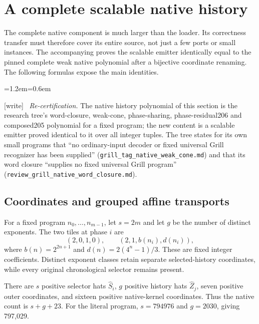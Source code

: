 \documentclass[11pt,letterpaper]{article}
\theoremstyle{definition}\newtheorem{definition}[theorem]{Definition}
\theoremstyle{remark}\newtheorem{remark}[theorem]{Remark}
\newcommand{\fname}[1]{\texttt{\small\detokenize{#1}}}
\newcommand{\wtag}{\textup{[write]}}
\newenvironment{writenote}{\par\smallskip\begin{list}{}{\leftmargin=1.2em\rightmargin=0.6em}\item[]\small\wtag\ }{\end{list}\smallskip}
\newcommand{\rw}[1]{\nolinkurl{#1}}%
\begin{document}
\section{A complete scalable native history}\label{fup:gp:sec:native}
The complete native component is much larger than the loader. Its correctness transfer must therefore cover its entire source, not just a few ports or small instances. The accompanying \fname{native_history_proof.md} proves the scalable emitter identically equal to the pinned complete weak native polynomial after a bijective coordinate renaming. The following formulas expose the main identities.
\begin{writenote}
\emph{Re-certification.} The native history polynomial of this section is the research tree's word-closure, weak-cone, phase-sharing, phase-residual206 and composed205 polynomial for a fixed program; the new content is a scalable emitter proved identical to it over all integer tuples. The tree states for its own small programs that ``no ordinary-input decoder or fixed universal Grill recognizer has been supplied'' (\rw{grill_tag_native_weak_cone.md}) and that its word closure ``supplies no fixed universal Grill program'' (\rw{review_grill_native_word_closure.md}).
\end{writenote}

\subsection{Coordinates and grouped affine transports}
For a fixed program $n_0,\ldots,n_{m-1}$, let $s=2m$ and let $g$ be the number of distinct exponents. The two tiles at phase $i$ are
\[
 (2,0,1,0),\qquad (2,1,b(n_i),d(n_i)),
\]
where $b(n)=2^{2n+1}$ and $d(n)=2(4^n-1)/3$. These are fixed integer coefficients. Distinct exponent classes retain separate selected-history coordinates, while every original chronological selector remains present.

There are $s$ positive selector hats $\widehat S_i$, $g$ positive history hats $\widehat Z_j$, seven positive outer coordinates, and sixteen positive native-kernel coordinates. Thus the native count is $s+g+23$. For the literal program, $s=794976$ and $g=2030$, giving 797,029.
\end{document}
